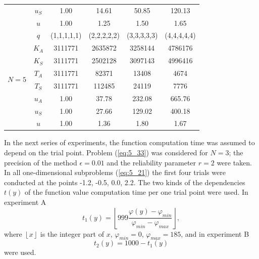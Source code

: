 \begin{table}
\begin{center}
\begin{tabular}{|c|c|c|c|c|c|}
\cline{2-6}
		& $u_S$ &  1.00  & 14.61  & 50.85  & 120.13   \\
\cline{2-6}
		& $u$   &  1.00  &  1.25  &  1.50  &   1.65   \\
\hline
\hline
\multirow{8}{*}{$N=5$} & $q$ & (1,1,1,1,1) & (2,2,2,2,2) & (3,3,3,3,3) & (4,4,4,4,4) \\  
\cline{2-6}
		& $K_A$ &  3111771  &  2635872  &  3258144  &  4786176   \\
\cline{2-6}
		& $K_S$ &  3111771  &  2502128  &  3097143  &  4996416   \\
\cline{2-6}
		& $T_A$ &  3111771  &  82371  &   13408  &   4674   \\	
\cline{2-6}
		& $T_S$ &  3111771  & 112485  &  24119  &    7776   \\		
\cline{2-6}
		& $u_A$ &  1.00  & 37.78  & 232.08  & 665.76   \\
\cline{2-6}
		& $u_S$ &  1.00  & 27.66  & 129.02  & 400.18   \\
\cline{2-6}
		& $u$   &  1.00  &  1.36  &  1.80  &   1.67   \\
\hline
\end{tabular}
\end{center}
\end{table}

In the next series of experiments, the function computation time was assumed to depend on the trial point. Problem (\ref{eq:5_33}) was considered for  $N=3$; the precision of the method $\epsilon=0.01$ and the reliability parameter $r=2$ were taken. In all one-dimensional subproblems (\ref{eq:5_21}) the first four trials were conducted at the points {-1.2, -0.5, 0.0, 2.2}. The two kinds of the dependencies $t(y)$ of the function value computation time per one trial point were used. In experiment A
\begin{displaymath}
t_1(y)=\left\lfloor 999\frac{\varphi(y)-\varphi_{min}}{\varphi_{min}-\varphi_{max}}\right\rfloor,
\end{displaymath}
where $\left\lfloor x\right\rfloor$  is the integer part of $x$, $\varphi_{min}=0$, $\varphi_{max}=185$, and in experiment B
\begin{displaymath}
t_2(y)=1000-t_1(y)
\end{displaymath}
were used.

